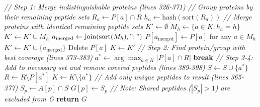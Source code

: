\documentclass{article}
\begin{document}
\begin{algorithm}[H]
\begin{algorithmic}[1]
        \State \textit{// Step 1: Merge indistinguishable proteins (lines 326-371)}
        \State \textit{// Group proteins by their remaining peptide sets}
            \State $R_a \gets P[a] \cap R$ 
            \State $h_a \gets \text{hash}(\text{sort}(R_a))$ 
        \EndFor
        \State \textit{// Merge proteins with identical remaining peptide sets}
        \State $K' \gets \emptyset$ 
            \State $M_h \gets \{a \in K : h_a = h\}$ 
                \State $K' \gets K' \cup M_h$ 
            \Else
                \State $a_{\text{merged}} \gets \text{join}(\text{sort}(M_h), ";")$ 
                \State $P[a_{\text{merged}}] \gets P[a]$ for any $a \in M_h$ 
                \State $K' \gets K' \cup \{a_{\text{merged}}\}$
                    \State Delete $P[a]$ 
                \EndFor
            \EndIf
        \EndFor
        \State $K \gets K'$ 
        \State
        \State \textit{// Step 2: Find protein/group with best coverage (lines 373-383)}
        \State $a^* \gets \arg\max_{a \in K} |P[a] \cap R|$ 
            \State \textbf{break} 
        \EndIf
        \State
        \State \textit{// Step 3-4: Add to necessary set and remove covered peptides (lines 389-398)}
        \State $S \gets S \cup \{a^*\}$ 
        \State $R \gets R \setminus P[a^*]$ 
        \State $K \gets K \setminus \{a^*\}$ 
    \EndWhile
    \State
    \State \textit{// Add only unique peptides to result (lines 365-377)}
        \State $S_p \gets A[p] \cap S$ 
            \State $G[p] \gets S_p$ 
        \EndIf
        \State \textit{// Note: Shared peptides ($|S_p| > 1$) are excluded from G}
    \EndFor
\EndFor
\State
\State \textbf{return} $G$ 
\end{algorithmic}
\end{algorithm}
\end{document}
